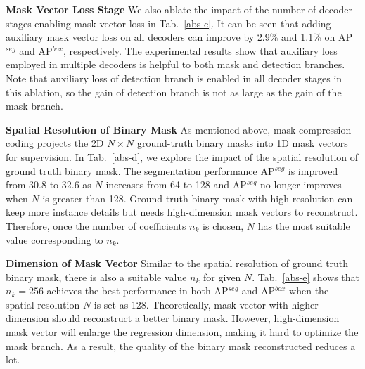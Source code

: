\documentclass{article}
\begin{document}
\textbf{Mask Vector Loss Stage}
We also ablate the impact of the number of decoder stages enabling mask vector loss in Tab.~\ref{abs-c}. It can be seen that adding auxiliary mask vector loss on all decoders can improve by 2.9\% and 1.1\% on AP$^{seg}$ and AP$^{box}$, respectively. The experimental results show that auxiliary loss employed in multiple decoders is helpful to both mask and detection branches. Note that auxiliary loss of detection branch is enabled in all decoder stages in this ablation, so the gain of detection branch is not as large as the gain of the mask branch.

\textbf{Spatial Resolution of Binary Mask}
As mentioned above, mask compression coding projects the 2D $N \times N$ ground-truth binary masks into 1D mask vectors for supervision. In Tab.~\ref{abs-d}, we explore the impact of the spatial resolution of ground truth binary mask. The segmentation performance AP$^{seg}$ is improved from 30.8 to 32.6 as $N$ increases from 64 to 128 and AP$^{seg}$ no longer improves when $N$ is greater than 128. Ground-truth binary mask with high resolution can keep more instance details but needs high-dimension mask vectors to reconstruct. Therefore, once the number of coefficients $n_{k}$ is chosen, $N$ has the most suitable value corresponding to $n_{k}$. 

\textbf{Dimension of Mask Vector}
Similar to the spatial resolution of ground truth binary mask, there is also a suitable value $n_{k}$ for given $N$. Tab.~\ref{abs-e} shows that $n_{k}=256$ achieves the best performance in both AP$^{seg}$ and AP$^{box}$ when the spatial resolution $N$ is set as 128. Theoretically, mask vector with higher dimension should reconstruct a better binary mask. However, high-dimension mask vector will enlarge the regression dimension, making it hard to optimize the mask branch. As a result, the quality of the binary mask reconstructed reduces a lot.
\end{document}
